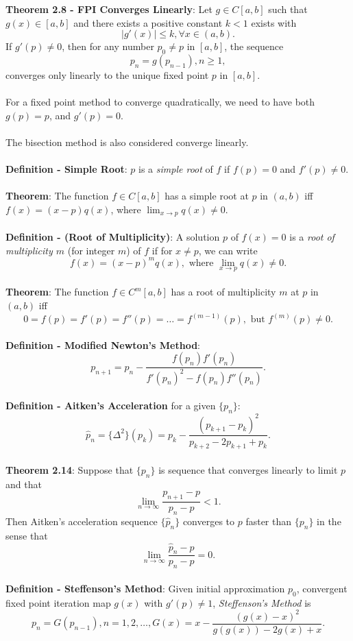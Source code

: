 \documentclass{article}
\begin{document}
\textbf{Theorem 2.8 - FPI Converges Linearly}: Let $g \in C[a, b]$ such that $g(x) \in [a, b]$ and there exists a positive constant $k < 1$ exists with $$|g'(x)| \leq k, \forall x \in (a, b).$$ If $g'(p) \neq 0$, then for any number $p_0 \neq p$ in $[a, b]$, the sequence $$p_n = g(p_{n - 1}), n \geq 1,$$ converges only linearly to the unique fixed point $p$ in $[a, b]$. \\ \\
For a fixed point method to converge quadratically, we need to have both $g(p) = p$, and $g'(p) = 0$. \\ \\
The bisection method is also considered converge linearly. \\ \\
\textbf{Definition - Simple Root}: $p$ is a \textit{simple root} of $f$ if $f(p) = 0$ and $f'(p) \neq 0$. \\ \\
\textbf{Theorem}: The function $f \in C[a, b]$ has a simple root at $p$ in $(a, b)$ iff $f(x) = (x - p)q(x)$, where $\lim_{x \rightarrow p} q(x) \neq 0$. \\ \\
\textbf{Definition - (Root of Multiplicity)}: A solution $p$ of $f(x) = 0$ is a \textit{root of multiplicity $m$} (for integer $m$) of $f$ if for $x \neq p$, we can write $$f(x) = (x - p)^m q(x), \text{ where } \lim_{x \rightarrow p} q(x) \neq 0.$$ \\
\textbf{Theorem}: The function $f \in C^m[a, b]$ has a root of multiplicity $m$ at $p$ in $(a, b)$ iff $$0 = f(p) = f'(p) = f''(p) = \dots = f^{(m - 1)}(p), \text{ but } f^{(m)}(p) \neq 0.$$ \\
\textbf{Definition - Modified Newton's Method}: $$p_{n + 1} = p_n - \frac{f(p_n) f'(p_n)}{f'(p_n)^2 - f(p_n)f''(p_n)}.$$ \\
\textbf{Definition - Aitken's Acceleration} for a given $\{p_n\}$: $$\widehat{p}_n = \{\Delta^2\}(p_k) = p_k - \frac{(p_{k + 1} - p_k)^2}{p_{k + 2} - 2p_{k + 1} + p_k}.$$ \\
\textbf{Theorem 2.14}: Suppose that $\{p_n\}$ is sequence that converges linearly to limit $p$ and that $$\lim_{n \rightarrow \infty} \frac{p_{n + 1} - p}{p_n - p} < 1.$$ Then Aitken's acceleration sequence $\{\widehat{p}_n\}$ converges to $p$ faster than $\{p_n\}$ in the sense that $$\lim_{n \rightarrow \infty} \frac{\widehat{p}_n - p}{p_n - p} = 0.$$ \\
\textbf{Definition - Steffenson’s Method}: Given initial approximation $p_0$, convergent fixed point iteration map $g(x)$ with $g'(p) \neq 1$, \textit{Steffenson’s Method} is $$p_n = G(p_{n - 1}), n = 1, 2, \dots, G(x) = x - \frac{(g(x) - x)^2}{g(g(x)) - 2g(x) + x}.$$ \\
\end{document}
